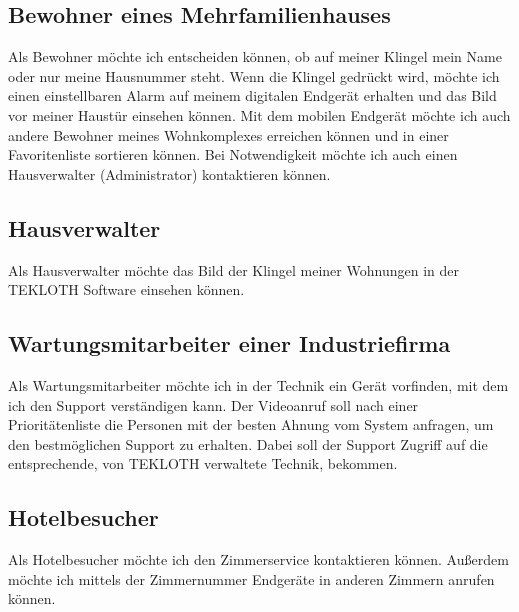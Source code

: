 \subsection{Bewohner eines Mehrfamilienhauses}\label{subsec:bewohner-eines-mehrfamilienhauses}
Als Bewohner möchte ich entscheiden können, ob auf meiner Klingel mein Name oder nur meine Hausnummer steht.
Wenn die Klingel gedrückt wird, möchte ich einen einstellbaren Alarm auf meinem digitalen Endgerät erhalten und das Bild vor meiner Haustür einsehen können.
Mit dem mobilen Endgerät möchte ich auch andere Bewohner meines Wohnkomplexes erreichen können und in einer Favoritenliste sortieren können.
Bei Notwendigkeit möchte ich auch einen Hausverwalter (Administrator) kontaktieren können.


\subsection{Hausverwalter}\label{subsec:hausverwalter}
Als Hausverwalter möchte das Bild der Klingel meiner Wohnungen in der TEKLOTH Software einsehen können.


\subsection{Wartungsmitarbeiter einer Industriefirma}\label{subsec:wartungsmitarbeiter-einer-industriefirma}
Als Wartungsmitarbeiter möchte ich in der Technik ein Gerät vorfinden, mit dem ich den Support verständigen kann.
Der Videoanruf soll nach einer Prioritätenliste die Personen mit der besten Ahnung vom System anfragen, um den bestmöglichen Support zu erhalten.
Dabei soll der Support Zugriff auf die entsprechende, von TEKLOTH verwaltete Technik, bekommen.


\subsection{Hotelbesucher}\label{subsec:hotelbesucher}
Als Hotelbesucher möchte ich den Zimmerservice kontaktieren können.
Außerdem möchte ich mittels der Zimmernummer Endgeräte in anderen Zimmern anrufen können.
